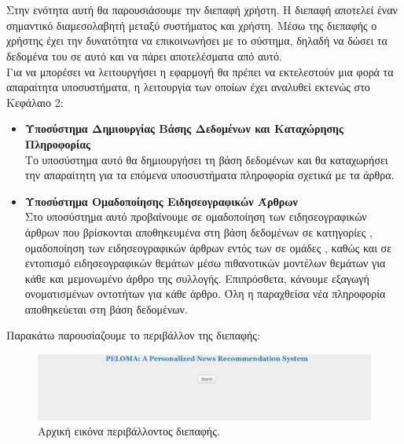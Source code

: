 \chapter{{}}

Στην ενότητα αυτή θα παρουσιάσουμε την διεπαφή χρήστη. 
Η διεπαφή αποτελεί έναν σημαντικό διαμεσολαβητή μεταξύ συστήματος και χρήστη. 
Μέσω της διεπαφής ο χρήστης έχει την δυνατότητα να επικοινωνήσει με το σύστημα, 
δηλαδή να δώσει τα δεδομένα του σε αυτό και να πάρει αποτελέσματα από αυτό. \\

Για να μπορέσει να λειτουργήσει η εφαρμογή θα πρέπει να εκτελεστούν μια φορά τα απαραίτητα
υποσυστήματα, η λειτουργία των οποίων έχει αναλυθεί εκτενώς στο Κεφάλαιο 2:

\begin{itemize}
\item \textbf{Υποσύστημα Δημιουργίας Βάσης Δεδομένων και Καταχώρησης Πληροφορίας} \\
Το υποσύστημα αυτό θα δημιουργήσει τη βάση δεδομένων και θα καταχωρήσει την απαραίτητη 
για τα επόμενα υποσυστήματα πληροφορία σχετικά με τα άρθρα. 

\item \textbf{Υποσύστημα Ομαδοποίησης Ειδησεογραφικών Άρθρων} \\
Στο υποσύστημα αυτό προβαίνουμε σε ομαδοποίηση των ειδησεογραφικών άρθρων που βρίσκονται 
αποθηκευμένα στη βάση δεδομένων σε κατηγορίες {}, 
ομαδοποίηση των ειδησεογραφικών άρθρων εντός των {} σε ομάδες {}, 
καθώς και σε εντοπισμό ειδησεογραφικών θεμάτων μέσω πιθανοτικών μοντέλων θεμάτων 
για κάθε {} και μεμονωμένο άρθρο της συλλογής. 
Επιπρόσθετα, κάνουμε εξαγωγή ονοματισμένων οντοτήτων για κάθε άρθρο.
Όλη η παραχθείσα νέα πληροφορία αποθηκεύεται στη βάση δεδομένων. 
\end{itemize}

\newpage
Παρακάτω παρουσίαζουμε το περιβάλλον της διεπαφής: \\

\begin{figure}[!ht] \centering
\centerline{
    \includegraphics[scale=0.45]{static/figures/peloma/start.png}}
    \caption{Αρχική εικόνα περιβάλλοντος διεπαφής.}
    \label{}
\end{figure} 


